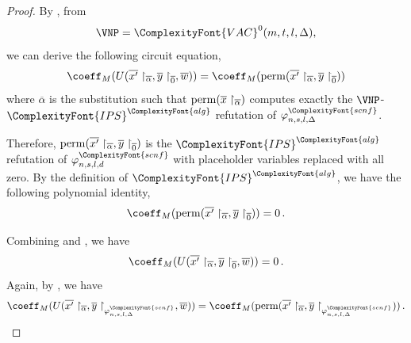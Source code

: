 \documentclass[11pt,letter]{article}
\theoremstyle{remark} %
\newcommand{\perm}{{\rm perm}}
\newcommand{\alg}{\ComplexityFont{alg}}
\newcommand{\IPS}{%
    {
        \ComplexityFont{IPS} 
    }
}
\newcommand{\scnf}{
    {
        \ComplexityFont{scnf}
    }
}
\newcommand{\VAC}{
    {
        \ComplexityFont{VAC}
    }
}
\begin{document}
{\begin{proof}
        By , from 
        \[
            \VNP = \VAC^0(m,t,l,\Delta),
        \]
        we can derive the following circuit equation,
        \begin{equation}
            \label{equa: equation for refutation predicate 1}
            \coeff_M(U(\overline{x^\prime}\restriction_{\overline{\alpha}}, \overline{y}\restriction_{\overline{0}},\overline{w})) = \coeff_M(\perm(\overline{x^\prime}\restriction_{\overline{\alpha}},\overline{y}\restriction_{\overline{0}}))
        \end{equation}
        where $\overline{\alpha}$ is the substitution such that $\perm(\overline{x}\restriction_{\overline{\alpha}})$ computes exactly the $\VNP$-$\IPS^\alg$ refutation of $\varphi_{n,s,l,\Delta}^\scnf$. 

        
        Therefore, $\perm(\overline{x^\prime}\restriction_{\overline{\alpha}},\overline{y}\restriction_{\overline{0}})$ is the $\IPS^\alg$ refutation of $\varphi_{n,s,l,d}^\scnf$ with placeholder variables replaced with all zero. By the definition of $\IPS^\alg$, we have the following polynomial identity,
        \begin{equation}
            \label{equa: equation for refutation predicate 2}
            \coeff_M(\perm(\overline{x^\prime}\restriction_{\overline{\alpha}},\overline{y}\restriction_{\overline{0}})) = 0\,.
        \end{equation}

        Combining  and , we have
        \begin{equation}
            \label{equa: first half of refutation predicate}
            \coeff_M(U(\overline{x^\prime}\restriction_{\overline{\alpha}}, \overline{y}\restriction_{\overline{0}},\overline{w})) = 0\,.
        \end{equation}
        Again, by , we have
        \begin{equation}
            \label{equa: equation for refutation predicate 3}
            \coeff_M(U(\overline{x^\prime}\restriction_{\overline{\alpha}},\overline{y}\restriction_{\varphi_{n,s,l,\Delta}^\scnf}, \overline{w})) = \coeff_M(\perm(\overline{x^\prime}\restriction_{\overline{\alpha}}, \overline{y}\restriction_{\varphi_{n,s,l,\Delta}^\scnf}))\,.
        \end{equation}


\end{proof}}
\end{document}

